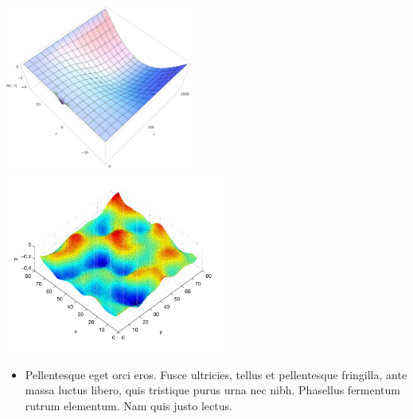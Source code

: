 \documentclass[a0,portrait]{a0poster}
\begin{document}
\begin{multicols}{2}
\begin{minipage}[b]{0.5\textwidth}
	\includegraphics[width=0.46\textwidth]{difuzija-logisticna-rast2.png}
	\includegraphics[width=0.54\textwidth]{KPZ-numericno.pdf}
\end{minipage}

\begin{itemize}
\item Pellentesque eget orci eros. Fusce ultricies, tellus et pellentesque fringilla, ante massa luctus libero, quis tristique purus urna nec nibh. Phasellus fermentum rutrum elementum. Nam quis justo lectus.
\end{itemize}

\color{DarkSlateGray} %


\nocite{*} %

\end{multicols}
\end{document}
